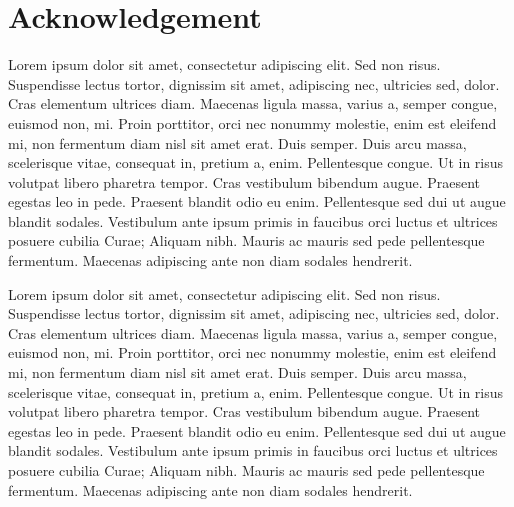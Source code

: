 \chapter*{Acknowledgement}
\thispagestyle{MyStyle}

Lorem ipsum dolor sit amet, consectetur adipiscing elit. Sed non risus. Suspendisse lectus tortor, dignissim sit amet, adipiscing nec, ultricies sed, dolor. Cras elementum ultrices diam. Maecenas ligula massa, varius a, semper congue, euismod non, mi. Proin porttitor, orci nec nonummy molestie, enim est eleifend mi, non fermentum diam nisl sit amet erat. Duis semper. Duis arcu massa, scelerisque vitae, consequat in, pretium a, enim. Pellentesque congue. Ut in risus volutpat libero pharetra tempor. Cras vestibulum bibendum augue. Praesent egestas leo in pede. Praesent blandit odio eu enim. Pellentesque sed dui ut augue blandit sodales. Vestibulum ante ipsum primis in faucibus orci luctus et ultrices posuere cubilia Curae; Aliquam nibh. Mauris ac mauris sed pede pellentesque fermentum. Maecenas adipiscing ante non diam sodales hendrerit.\par
\vspace{0.3cm}
Lorem ipsum dolor sit amet, consectetur adipiscing elit. Sed non risus. Suspendisse lectus tortor, dignissim sit amet, adipiscing nec, ultricies sed, dolor. Cras elementum ultrices diam. Maecenas ligula massa, varius a, semper congue, euismod non, mi. Proin porttitor, orci nec nonummy molestie, enim est eleifend mi, non fermentum diam nisl sit amet erat. Duis semper. Duis arcu massa, scelerisque vitae, consequat in, pretium a, enim. Pellentesque congue. Ut in risus volutpat libero pharetra tempor. Cras vestibulum bibendum augue. Praesent egestas leo in pede. Praesent blandit odio eu enim. Pellentesque sed dui ut augue blandit sodales. Vestibulum ante ipsum primis in faucibus orci luctus et ultrices posuere cubilia Curae; Aliquam nibh. Mauris ac mauris sed pede pellentesque fermentum. Maecenas adipiscing ante non diam sodales hendrerit.\par